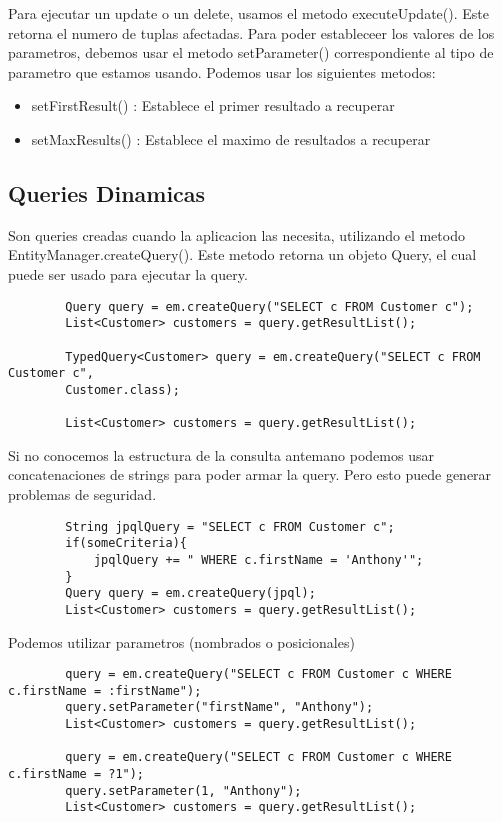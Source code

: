\documentclass{article}
\begin{document}
Para ejecutar un update o un delete, usamos el metodo executeUpdate(). Este retorna el numero de tuplas afectadas. Para poder estableceer los valores de los parametros,
debemos usar el metodo setParameter() correspondiente al tipo de parametro que estamos usando. Podemos usar los siguientes metodos:
\begin{itemize}
	\item setFirstResult() : Establece el primer resultado a recuperar
	\item setMaxResults() : Establece el maximo de resultados a recuperar
\end{itemize}

\subsection*{Queries Dinamicas}
Son queries creadas cuando la aplicacion las necesita, utilizando el metodo EntityManager.createQuery(). Este metodo retorna un objeto Query, el cual puede ser usado para ejecutar la query.

\begin{lstlisting}
        Query query = em.createQuery("SELECT c FROM Customer c");
        List<Customer> customers = query.getResultList();

        TypedQuery<Customer> query = em.createQuery("SELECT c FROM Customer c", 
        Customer.class);

        List<Customer> customers = query.getResultList();
    \end{lstlisting}

Si no conocemos la estructura de la consulta antemano podemos usar concatenaciones de strings para poder armar la query. Pero esto puede generar problemas de seguridad.

\begin{lstlisting}
        String jpqlQuery = "SELECT c FROM Customer c";
        if(someCriteria){
            jpqlQuery += " WHERE c.firstName = 'Anthony'";
        }
        Query query = em.createQuery(jpql);
        List<Customer> customers = query.getResultList();
    \end{lstlisting}

Podemos utilizar parametros (nombrados o posicionales)

\begin{lstlisting}
        query = em.createQuery("SELECT c FROM Customer c WHERE c.firstName = :firstName");
        query.setParameter("firstName", "Anthony");
        List<Customer> customers = query.getResultList();

        query = em.createQuery("SELECT c FROM Customer c WHERE c.firstName = ?1");
        query.setParameter(1, "Anthony");
        List<Customer> customers = query.getResultList();
    \end{lstlisting}
\end{document}
